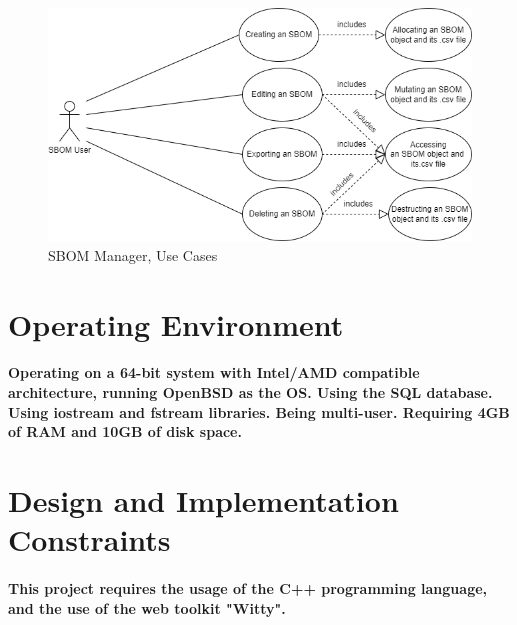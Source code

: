 \documentclass[letterpaper,12pt,oneside,listof=totoc]{scrreprt}
\begin{document}
\begin{figure}[H]
    \centering
    \includegraphics[width=1\linewidth]{SBOM_UseCase.drawio.png}
    \caption{SBOM Manager, Use Cases}
    \label{fig:enter-label}
\end{figure}

\section{Operating Environment}
\paragraph{ \normalfont
 Operating on a 64-bit system with Intel/AMD compatible architecture, running OpenBSD as the OS. Using the SQL database. Using iostream and fstream libraries. Being multi-user.
 \newline \newline
 Requiring 4GB of RAM and 10GB of disk space.
}


\section{Design and Implementation Constraints}
\paragraph{ \normalfont
This project requires the usage of the C++ programming language, and the use of the web toolkit "Witty".
}
\end{document}
